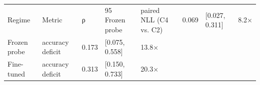 \begin{tabular}{lllll}
\toprule
Regime & Metric & ρ & 95%
\midrule
Frozen probe & paired NLL (C4 vs. C2) & 0.069 & [0.027, 0.311] & 8.2× \\
Frozen probe & accuracy deficit & 0.173 & [0.075, 0.558] & 13.8× \\
Fine-tuned & accuracy deficit & 0.313 & [0.150, 0.733] & 20.3× \\
\bottomrule
\end{tabular}
